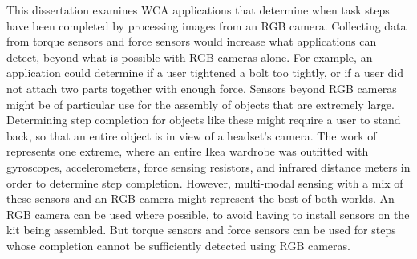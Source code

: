 This dissertation examines WCA applications that determine when task steps have
been completed by processing images from an RGB camera.
Collecting data from torque sensors and force sensors would increase what
applications can detect, beyond what is possible with RGB cameras alone.
For example, an application could determine if a user tightened a bolt too
tightly, or if a user did not attach two parts together with enough force.
Sensors beyond RGB cameras might be of particular use for the assembly of
objects that are extremely large.
Determining step completion for objects like these might require a user to stand
back, so that an entire object is in view of a headset's camera.
The work of \citet{sensors} represents one extreme, where an entire Ikea
wardrobe was outfitted with gyroscopes, accelerometers, force sensing resistors,
and infrared distance meters in order to determine step completion.
However, multi-modal sensing with a mix of these sensors and an RGB camera might
represent the best of both worlds.
An RGB camera can be used where possible, to avoid having to install sensors on
the kit being assembled.
But torque sensors and force sensors can be used for steps whose completion
cannot be  sufficiently detected using RGB cameras.
